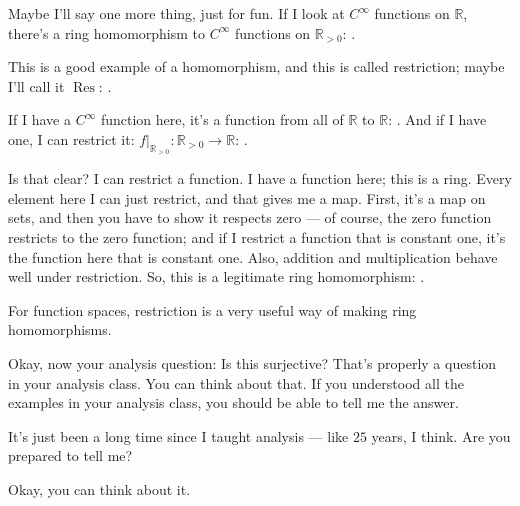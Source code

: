 \begin{speech}[01:03:45 - 01:05:45]
Maybe I'll say one more thing, just for fun. If I look at $C^\infty$ functions on $\mathbb{R}$,  there's a ring homomorphism to $C^\infty$ functions on $\mathbb{R}_{>0}$: .

This is a good example of a homomorphism, and this is called restriction; maybe I'll call it $\operatorname{Res}$: .

If I have a $C^\infty$ function here, it's a function from all of $\mathbb{R}$ to $\mathbb{R}$: . And if I have one, I can restrict it: $f|_{\mathbb{R}_{>0}} \colon \mathbb{R}_{>0} \to \mathbb{R}$: .

Is that clear? I can restrict a function. I have a function here; this is a ring. Every element here I can just restrict, and that gives me a map. First, it's a map on sets, and then you have to show it respects zero --- of course, the zero function restricts to the zero function; and if I restrict a function that is constant one, it's the function here that is constant one. Also, addition and multiplication behave well under restriction. So, this is a legitimate ring homomorphism: .

For function spaces, restriction is a very useful way of making ring homomorphisms.

Okay, now your analysis question: Is this surjective? That's properly a question in your analysis class. You can think about that. If you understood all the examples in your analysis class, you should be able to tell me the answer.
\end{speech}

\begin{speech}[01:05:45 - 01:06:13]
It's just been a long time since I taught analysis --- like $25$ years, I think.
 Are you prepared to tell me?

Okay, you can think about it.
\end{speech}

